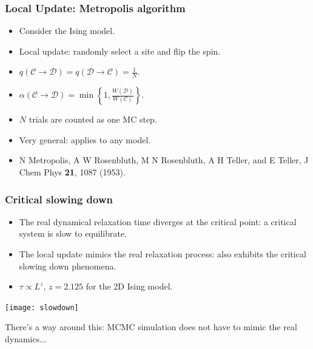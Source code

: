 \documentclass[xcolor=table, 10pt, aspectratio=169, ignorenonframetext]{beamer}
\begin{document}
\begin{frame}
  \frametitle{Local Update: Metropolis algorithm}
  \begin{center}
  \end{center}
  \begin{itemize}
    \item Consider the Ising model.
    \item Local update: randomly select a site and flip the spin.
    \item $q(\mathcal C\rightarrow\mathcal D) = q(\mathcal D\rightarrow\mathcal C) = \frac1N$.
    \item $\alpha(\mathcal C\rightarrow\mathcal D)=\min\left\{1,\frac{W(\mathcal D)}{W(\mathcal C)}\right\}.$
    \item $N$ trials are counted as one MC step.
    \item Very general: applies to any model.
    \item N Metropolis, A W Rosenbluth, M N Rosenbluth, A H Teller, and E Teller, J Chem Phys \textbf{21}, 1087 (1953).
  \end{itemize}
\end{frame}

\begin{frame}
  \frametitle{Critical slowing down}
  \begin{itemize}
    \item The real dynamical relaxation time diverges at the critical point: a critical system is slow to equilibrate.
    \item The local update mimics the real relaxation process: also exhibits the critical slowing down phenomena.
    \item $\tau\propto L^z$, $z=2.125$ for the 2D Ising model.
  \end{itemize}
  \begin{center}
    \texttt{[image: slowdown]}
  \end{center}
  There's a way around this: MCMC simulation does not have to mimic the real dynamics...
\end{frame}
\end{document}
